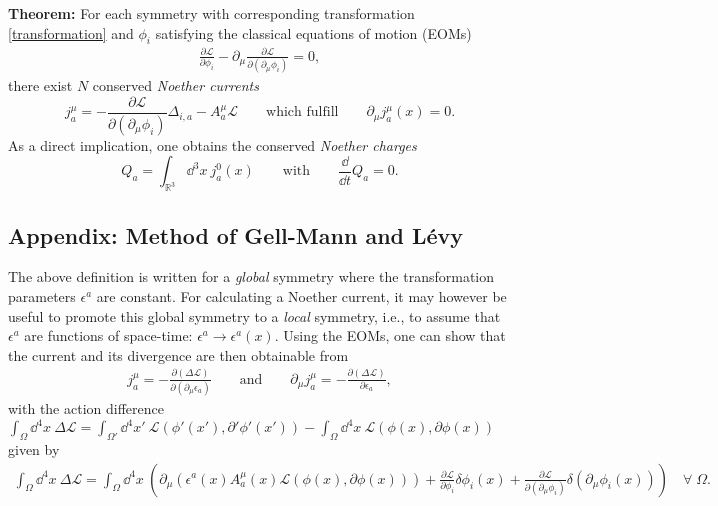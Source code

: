 \documentclass[11pt]{latex/exercise}
\begin{document}
\textbf{Theorem:} For each symmetry with corresponding transformation \eqref{transformation} and $\phi_i$ satisfying the classical equations of motion (EOMs)
\begin{align}
    \frac{\partial \mathcal{L}}{\partial \phi_i} - \partial_\mu \frac{\partial \mathcal{L}}{\partial(\partial_\mu \phi_i)} = 0,
\end{align}
there exist $N$ conserved \textit{Noether currents}
\begin{equation}
    \label{eq:noether_current}
    j^\mu_a = -\frac{\partial \mathcal{L}}{\partial (\partial_\mu \phi_i)} \Delta_{i,a} - A^\mu_a \mathcal{L} \qquad \text{which fulfill} \qquad \partial_\mu j^\mu_a (x) = 0 .
\end{equation}
As a direct implication, one obtains the conserved \textit{Noether charges}
\begin{equation}
    Q_a = \int_{\mathbb{R}^3} \dd^3 x \: j^0_a (x) \qquad \text{with} \qquad \frac{\dd}{\dd t} Q_a = 0 .
\end{equation}

\subsection*{Appendix: Method of Gell-Mann and L\'evy}

The above definition is written for a \textit{global} symmetry where the transformation parameters $\epsilon^a$ are constant.
For calculating a Noether current, it may however be useful to promote this global symmetry to a \textit{local} symmetry, i.e., to assume that $\epsilon^a$ are functions of space-time: $\epsilon^a \rightarrow \epsilon^a(x)$.
Using the EOMs, one can show that the current and its divergence are then obtainable from
\begin{align}
    \label{eq:gell-mann_levy}
    j^\mu_a = -\frac{\partial(\Delta \mathcal{L})}{\partial(\partial_\mu \epsilon_a)}
    \qquad \text{and} \qquad
    \partial_\mu j^\mu_a = -\frac{\partial(\Delta \mathcal{L})}{\partial \epsilon_a} ,
\end{align}
with the action difference $\int_\Omega \dd^4 x \: \Delta \mathcal{L} = \int_{\Omega'} \dd^4 x' \: \mathcal{L}(\phi'(x'), \partial' \phi'(x')) - \int_\Omega \dd^4 x \: \mathcal{L}(\phi(x), \partial \phi(x))$ given by
\begin{align}
    \int_\Omega \dd^4 x \: \Delta \mathcal{L} = \int_\Omega \dd^4 x \: \left( \partial_\mu( \epsilon^a(x) A^\mu_a(x) \mathcal{L}(\phi(x), \partial \phi(x)) )
    + \frac{\partial \mathcal{L}}{\partial \phi_i} \delta \phi_i(x)
    + \frac{\partial \mathcal{L}}{\partial(\partial_\mu \phi_i)} \delta(\partial_\mu \phi_i(x)) \right)
    \quad \forall \; \Omega.
\end{align}
\end{document}
